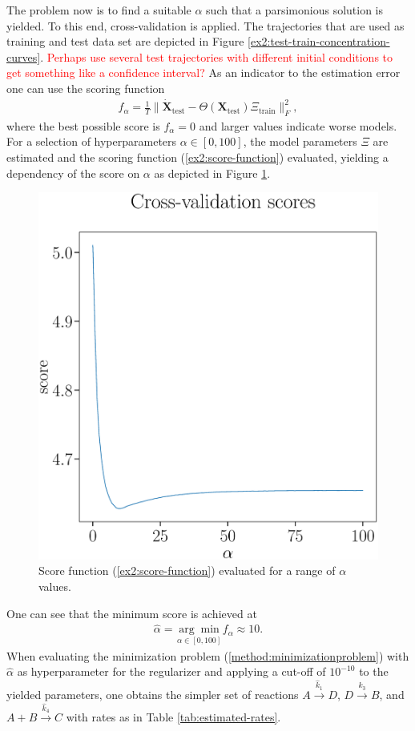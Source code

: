 \documentclass[oneside, abstracton, titlepage]{scrartcl}
\begin{document}
	The problem now is to find a suitable $\alpha$ such that a parsimonious solution is yielded. To this end, cross-validation is applied. The trajectories that are used as training and test data set are depicted in Figure \ref{ex2:test-train-concentration-curves}. \textcolor{red}{Perhaps use several test trajectories with different initial conditions to get something like a confidence interval?} As an indicator to the estimation error one can use the scoring function
	\begin{align}
		f_\alpha = \frac{1}{T}\|\mathbf{\dot{X}}_\text{test} - \Theta (\textbf{X}_\text{test}) \Xi_\text{train}\|_F^2,
		\label{ex2:score-function}
	\end{align}
	where the best possible score is $f_\alpha = 0$ and larger values indicate worse models.
	For a selection of hyperparameters $\alpha\in [0, 100]$, the model parameters $\Xi$ are estimated and the scoring function (\ref{ex2:score-function}) evaluated, yielding a dependency of the score on $\alpha$ as depicted in Figure \ref{ex2:score-graph}.

	\begin{figure}
		\begin{center}
			\includegraphics[width=.5\textwidth]{./figures_tex/cv_score}
		\end{center}
		\caption{Score function (\ref{ex2:score-function}) evaluated for a range of $\alpha$ values.}
		\label{ex2:score-graph}
	\end{figure}

	One can see that the minimum score is achieved at
	\begin{align}
		\hat{\alpha} = \underset{\alpha\in[0,100]}{\arg\min}f_\alpha\approx 10.
	\end{align}
	When evaluating the minimization problem (\ref{method:minimizationproblem}) with $\hat{\alpha}$ as hyperparameter for the regularizer and applying a cut-off of $10^{-10}$ to the yielded parameters, one obtains the simpler set of reactions $A\xrightarrow{\hat{k}_1}D$, $D\xrightarrow{\hat{k}_3} B$, and $A+B\xrightarrow{\hat{k}_4}C$ with rates as in Table \ref{tab:estimated-rates}.
\end{document}
